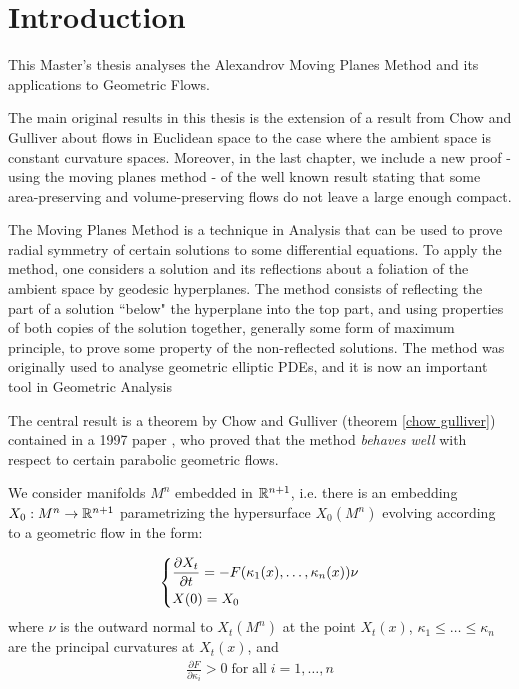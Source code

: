 \chapter*{Introduction}

This Master's thesis analyses the Alexandrov Moving Planes Method and its applications to Geometric Flows. 

The main original results in this thesis is the extension of a result from Chow and Gulliver about flows in Euclidean space to  the case where the ambient space is constant curvature spaces. Moreover, in the last chapter, we include a new proof - using the moving planes method - of the well known result stating that some area-preserving and volume-preserving flows do not leave a large enough compact. 

The Moving Planes Method is a technique in Analysis that can be used to prove radial symmetry of certain solutions to some differential equations. To apply the method, one considers a solution and its reflections about a foliation of the ambient space by geodesic hyperplanes. The method consists of reflecting the part of a solution ``below" the hyperplane into the top part, and using properties of both copies of the solution together, generally some form of maximum principle, to prove some property of the non-reflected solutions. The method was originally used to analyse geometric elliptic PDEs, and it is now an important tool in Geometric Analysis

The central result is a theorem by Chow and Gulliver (theorem \ref{chow gulliver}) contained in a 1997 paper \cite{Chow}, who proved that the method \textit{behaves well} with respect to certain parabolic geometric flows. 


We consider manifolds $M^n$ embedded in $\mathbb{R}^{n+1}$, i.e. there is an embedding $X_0 : M^n \rightarrow \mathbb{R}^{n+1}$ parametrizing the hypersurface $X_0(M^n)$ evolving according to a geometric flow in the form: 

\begin{align*}
	\begin{dcases}
		\frac{\partial X_t}{\partial t} = - F(\kappa_1(x), \dots , \kappa_n(x)) \nu\\
		X(0)= X_0
	\end{dcases} 
\end{align*}
where $\nu$ is the outward normal to $X_t(M^n)$ at the point $X_t(x)$, $\kappa_1\leq \dots \leq \kappa_n$ are the principal curvatures at $X_t(x)$, and 
\begin{align*}
	\frac{\partial F}{\partial \kappa_i} > 0 \mathrm{\; for \; all } \; i=1,\dots, n
\end{align*}

